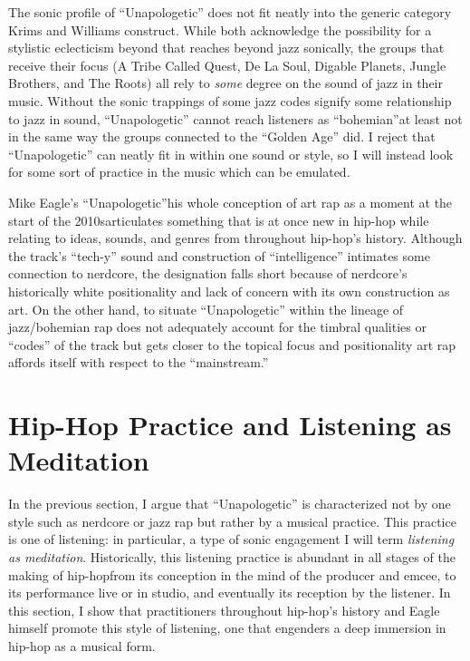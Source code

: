 The sonic profile of ``Unapologetic'' does not fit neatly into the generic category Krims and Williams
construct. While both acknowledge the possibility for a stylistic eclecticism beyond that reaches beyond
jazz sonically, the groups that receive their focus (A Tribe Called Quest, De La Soul, Digable Planets, 
Jungle Brothers, and The Roots) all rely to \emph{some} degree on the sound of jazz in their music. 
Without the sonic trappings of some jazz codes signify some relationship to jazz in sound, 
``Unapologetic'' cannot reach listeners as ``bohemian''\textemdash at least not in the same way 
the groups connected to the ``Golden Age'' did. I reject that ``Unapologetic'' can neatly
fit in within one sound or style, so I will instead look for some sort of practice in the music
which can be emulated.

Mike Eagle's ``Unapologetic''\textemdash his whole conception of art rap as a moment at the start
of the 2010s\textemdash articulates something that is at once new in hip-hop while relating to ideas,
sounds, and genres from throughout hip-hop's history. Although the track's ``tech-y'' sound and 
construction of ``intelligence'' intimates some connection to nerdcore, the designation falls short 
because of nerdcore's historically white positionality and lack of concern with its own construction 
as art. On the other hand, to situate ``Unapologetic'' within the lineage of jazz/bohemian rap does 
not adequately account for the  timbral qualities or ``codes'' of the track but gets closer to the 
topical focus and  positionality art rap affords itself with respect to the ``mainstream.''

\section{Hip-Hop Practice and Listening as Meditation} \label{listeningasmeditation}

In the previous section, I argue that ``Unapologetic'' is characterized not by one style such as
nerdcore or jazz rap but rather by a musical practice. This practice is one of listening: in 
particular, a type of sonic engagement I will term \emph{listening as meditation}. Historically,
this listening practice is abundant in all stages of the making of hip-hop\textemdash from its 
conception in the mind of the producer and emcee, to its performance live or in studio, and 
eventually its reception by the listener. In this section, I show that practitioners throughout
hip-hop's history and Eagle himself promote this style of listening, one that engenders a deep 
immersion in hip-hop as a  musical form.

